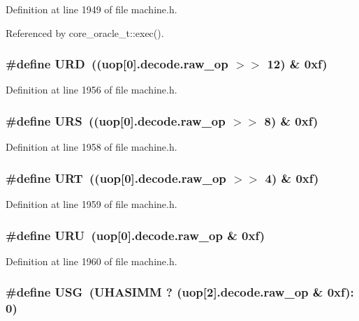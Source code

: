 Definition at line 1949 of file machine.h.

Referenced by core\_\-oracle\_\-t::exec().
\subsubsection[{URD}]{\setlength{\rightskip}{0pt plus 5cm}\#define URD~((uop[0].decode.raw\_\-op $>$$>$ 12) \& 0xf)}\label{machine_8h_b78850689b150ce8d286d89073103e42}




Definition at line 1956 of file machine.h.
\subsubsection[{URS}]{\setlength{\rightskip}{0pt plus 5cm}\#define URS~((uop[0].decode.raw\_\-op $>$$>$ 8) \& 0xf)}\label{machine_8h_2795f4caee51946249dfdd571be27a36}




Definition at line 1958 of file machine.h.
\subsubsection[{URT}]{\setlength{\rightskip}{0pt plus 5cm}\#define URT~((uop[0].decode.raw\_\-op $>$$>$ 4) \& 0xf)}\label{machine_8h_0ae92330b1f871f246d144ef342aff1b}




Definition at line 1959 of file machine.h.
\subsubsection[{URU}]{\setlength{\rightskip}{0pt plus 5cm}\#define URU~(uop[0].decode.raw\_\-op \& 0xf)}\label{machine_8h_3ec436c05773debe2bba05c560f08a55}




Definition at line 1960 of file machine.h.
\subsubsection[{USG}]{\setlength{\rightskip}{0pt plus 5cm}\#define USG~(UHASIMM ? (uop[2].decode.raw\_\-op \& 0xf): 0)}\label{machine_8h_d1bc0dd24bead91c0bba1ded526fc471}




